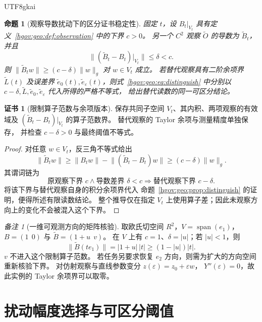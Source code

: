 \documentclass[12pt,a4paper,openany,notitlepage]{report}
\theoremstyle{plain}
\newtheorem{proposition}[theorem]{命题}
\theoremstyle{definition}
\newtheorem*{certificate}{证书}
\theoremstyle{remark}
\newtheorem{remark}[theorem]{备注}
\def\mathcal#1{#1}\def\mathsf#1{#1}\def\mathbb#1{#1}%
\begin{document}
\begin{CJK*}{UTF8}{gkai}
\begin{proposition}[观察导数扰动下的区分证书稳定性]
\label{exp:geo:prop:observation-robustness}
固定 $t$，设 $B_t|_{V_t}$ 具有定义~\ref{hgov:geo:def:observation} 中的下界 $c>0$。
另一个 $C^2$ 观察 $\widetilde{\mathcal O}$ 的导数为 $\widetilde B_t$，并且
\[
\bigl\|(\widetilde B_t-B_t)|_{V_t}\bigr\|\le\delta<c.
\]
则 $\lVert\widetilde B_tw\rVert\ge(c-\delta)\lVert w\rVert_g$ 对 $w\in V_t$ 成立。
若替代观察具有二阶余项界 $\widetilde L(t)$ 及误差界
$\widetilde e_0(t),\widetilde e_\varepsilon(t)$，则式~\eqref{hgov:geo:eq:distinguish}
中分别以 $c-\delta,\widetilde L,\widetilde e_0,\widetilde e_\varepsilon$ 代入所得的严格不等式，
给出替代读数的同一可区分结论。
\end{proposition}
\begin{certificate}[限制算子范数与余项版本]
保存共同子空间 $V_t$、其内积、两项观察的有效域及
$(\widetilde B_t-B_t)|_{V_t}$ 的算子范数界。
替代观察的 Taylor 余项与测量精度单独保存，
并检查 $c-\delta>0$ 与最终阈值不等式。
\end{certificate}
\begin{proof}
对任意 $w\in V_t$，反三角不等式给出
\[
\lVert\widetilde B_tw\rVert
\ge\lVert B_tw\rVert-\lVert(\widetilde B_t-B_t)w\rVert
\ge(c-\delta)\lVert w\rVert_g.
\]
其谓词链为
\[
\text{原观察下界 }c\land\text{导数差界 }\delta<c
\Longrightarrow\text{替代观察下界 }c-\delta.
\]
将该下界与替代观察自身的积分余项界代入
命题~\ref{hgov:geo:prop:distinguish} 的证明，便得所述有限读数结论。
整个推导仅在指定 $V_t$ 上使用算子差；因此未观察方向上的变化不会被混入这个下界。
\end{proof}

\begin{remark}[一维可观测方向的矩阵核验]
取欧氏切空间 $\mathbb R^2$，$V=\operatorname{span}(e_1)$，
$B=(1\ \ 0)$ 与 $\widetilde B=(1+u\ \ v)$。
在 $V$ 上有 $c=1$、$\delta=|u|$；若 $|u|<1$，则
\[
\lVert\widetilde B(te_1)\rVert=|1+u|\,|t|
\ge(1-|u|)|t|.
\]
$v$ 不进入这个限制算子范数。
若任务另要求恢复 $e_2$ 方向，则需为扩大的方向空间重新核验下界。
对仿射观察与直线参数变分 $z(\varepsilon)=z_0+\varepsilon w$，
$Y''(\varepsilon)=0$，故此实例的 Taylor 余项界可以取零。
\end{remark}

\section{扰动幅度选择与可区分阈值}
\label{exp:geo:section:amplitude}


\end{CJK*}
\end{document}
